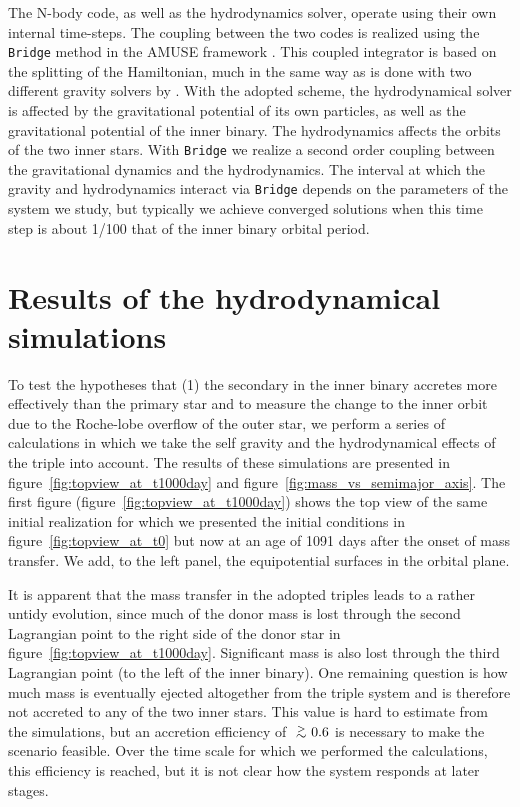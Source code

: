 \documentclass{aastex62}
\def\apgt{\ {\raise-.5ex\hbox{$\buildrel>\over\sim$}}\ }
\begin{document}
The N-body code, as well as the hydrodynamics solver, operate using
their own internal time-steps. The coupling between the two codes is
realized using the \texttt{Bridge} method in the AMUSE framework
\citep[see Sect.\.4.3.1 in][]{2013CoPhC.183..456P}.  This coupled
integrator is based on the splitting of the Hamiltonian, much in the
same way as is done with two different gravity solvers by
\cite{2007PASJ...59.1095F}. With the adopted scheme, the
hydrodynamical solver is affected by the gravitational potential of
its own particles, as well as the gravitational potential of the inner
binary. The hydrodynamics affects the orbits of the two inner stars. With
\texttt{Bridge} we realize a second order coupling between the
gravitational dynamics and the hydrodynamics.  The interval at which
the gravity and hydrodynamics interact via \texttt{Bridge} depends on
the parameters of the system we study, but typically we achieve
converged solutions when this time step is about 1/100 that 
of the inner binary orbital period.

\section{Results of the hydrodynamical simulations} \label{results}

To test the hypotheses that (1) the secondary in the inner binary
accretes more effectively than the primary star and to measure the
change to the inner orbit due to the Roche-lobe overflow of the outer
star, we perform a series of calculations in which we take the self
gravity and the hydrodynamical effects of the triple into account.
The results of these simulations are presented in
figure~\ref{fig:topview_at_t1000day} and
figure~\ref{fig:mass_vs_semimajor_axis}.  The first figure
(figure~\ref{fig:topview_at_t1000day}) shows the top view of the same
initial realization for which we presented the initial conditions in
figure~\ref{fig:topview_at_t0} but now at an age of 1091 days after
the onset of mass transfer. We add, to the left panel,
the equipotential surfaces in the orbital plane.

It is apparent that the mass transfer in the adopted triples leads to
a rather untidy evolution, since much of the donor
mass is lost through the second Lagrangian point to the right side of
the donor star in figure~\ref{fig:topview_at_t1000day}. Significant mass is
also lost through the third Lagrangian point (to the left of the inner
binary). One remaining question is how much mass is eventually ejected
altogether from the triple system and is therefore not accreted to any
of the two inner stars. This value is hard to estimate from the
simulations, but an accretion efficiency of $\apgt 0.6$ is necessary to
make the scenario feasible. Over the time scale for which we performed
the calculations, this efficiency is reached, but it is not clear how
the system responds at later stages.
\end{document}
